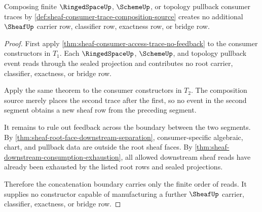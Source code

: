 \begin{theorem}
\label{thm:sheaf-consumer-trace-composition-no-feedback}
Composing finite $\RingedSpaceUp$, $\SchemeUp$, or topology pullback consumer traces by \autoref{def:sheaf-consumer-trace-composition-source} creates no additional $\SheafUp$ carrier row, classifier row, exactness row, or bridge row.
\end{theorem}
\begin{proof}
First apply \autoref{thm:sheaf-consumer-access-trace-no-feedback} to the consumer constructors in $T_1$. Each $\RingedSpaceUp$, $\SchemeUp$, and topology pullback event reads through the sealed projection and contributes no root carrier, classifier, exactness, or bridge row.

Apply the same theorem to the consumer constructors in $T_2$. The composition source merely places the second trace after the first, so no event in the second segment obtains a new sheaf row from the preceding segment.

It remains to rule out feedback across the boundary between the two segments. By \autoref{thm:sheaf-root-face-downstream-separation}, consumer-specific algebraic, chart, and pullback data are outside the root sheaf faces. By \autoref{thm:sheaf-downstream-consumption-exhaustion}, all allowed downstream sheaf reads have already been exhausted by the listed root rows and sealed projections.

Therefore the concatenation boundary carries only the finite order of reads. It supplies no constructor capable of manufacturing a further $\SheafUp$ carrier, classifier, exactness, or bridge row.
\end{proof}


